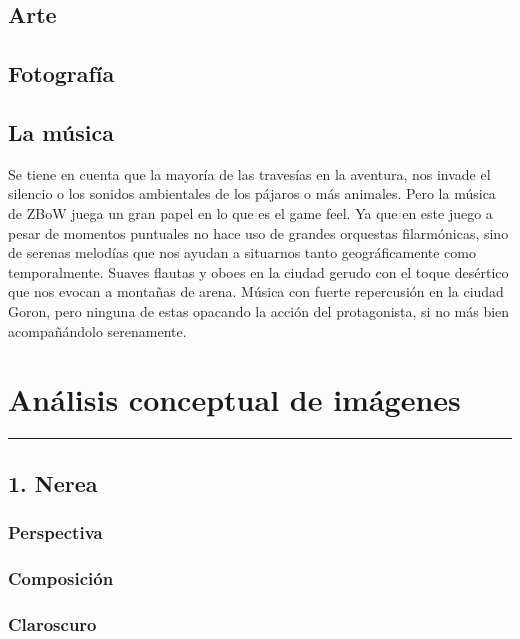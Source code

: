 \documentclass[12pt]{article}
\begin{document}
\subsection{Arte}

\subsection{Fotografía}

\subsection{La música}
Se tiene en cuenta que la mayoría de las travesías en la aventura, nos invade el silencio o los sonidos ambientales de los pájaros o más animales. Pero la música de ZBoW juega un gran papel en lo que es el game feel. Ya que en este juego a pesar de momentos puntuales no hace uso de grandes orquestas filarmónicas, sino de serenas melodías que nos ayudan a situarnos tanto geográficamente como temporalmente. Suaves flautas y oboes en la ciudad gerudo con el toque desértico que nos evocan a montañas de arena. Música con fuerte repercusión en la ciudad Goron, pero ninguna de estas opacando la acción del protagonista, si no más bien acompañándolo serenamente.


\newpage
\section{Análisis conceptual de imágenes}
    \hrule
\vspace{1cm}
    \subsection{1. Nerea}
        \subsubsection{Perspectiva}

        \subsubsection{Composición}

        \subsubsection{Claroscuro}
\end{document}
